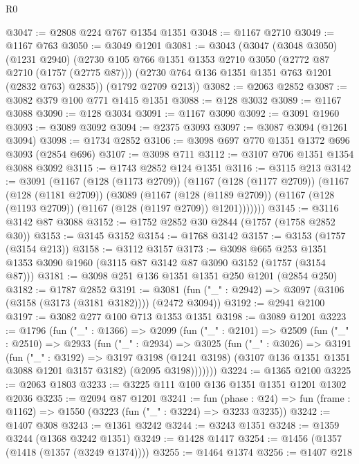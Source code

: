 \begin{lexlean}{R0}
\begin{coremodule}
@3047 := @2808 @224 @767 @1354 @1351
@3048 := @1167 @2710
@3049 := @1167 @763
@3050 := @3049 @1201
@3081 := @3043
    (@3047
      (@3048 @3050)
      (@1231 @2940)
      (@2730
        @105
        @766
        @1351
        @1353
        @2710
        @3050
        (@2772 @87 @2710 (@1757 (@2775 @87)))
        (@2730 @764 @136 @1351 @1351 @763 @1201 (@2832 @763) @2835))
      (@1792 @2709 @213))
@3082 := @2063 @2852
@3087 := @3082 @379 @100 @771 @1415 @1351
@3088 := @128 @3032
@3089 := @1167 @3088
@3090 := @128 @3034
@3091 := @1167 @3090
@3092 := @3091 @1960
@3093 := @3089 @3092
@3094 := @2375 @3093
@3097 := @3087 @3094 (@1261 @3094)
@3098 := @1734 @2852
@3106 := @3098 @697 @770 @1351 @1372 @696 @3093 (@2854 @696)
@3107 := @3098 @711
@3112 := @3107 @706 @1351 @1354 @3088 @3092
@3115 := @1743 @2852 @124 @1351
@3116 := @3115 @213
@3142 := @3091
    (@1167
      (@128 (@1173 @2709))
      (@1167
        (@128 (@1177 @2709))
        (@1167
          (@128 (@1181 @2709))
          (@3089
            (@1167
              (@128 (@1189 @2709))
              (@1167 (@128 (@1193 @2709)) (@1167 (@128 (@1197 @2709)) @1201)))))))
@3145 := @3116 @3142 @87 @3088
@3152 := @1752 @2852 @30 @2844 (@1757 (@1758 @2852 @30))
@3153 := @3145 @3152
@3154 := @1768 @3142
@3157 := @3153 (@1757 (@3154 @213))
@3158 := @3112 @3157
@3173 := @3098
    @665
    @253
    @1351
    @1353
    @3090
    @1960
    (@3115 @87 @3142 @87 @3090 @3152 (@1757 (@3154 @87)))
@3181 := @3098 @251 @136 @1351 @1351 @250 @1201 (@2854 @250)
@3182 := @1787 @2852
@3191 := @3081 (fun ("_" : @2942) => @3097 (@3106 (@3158 (@3173 (@3181 @3182)))) (@2472 @3094))
@3192 := @2941 @2100
@3197 := @3082 @277 @100 @713 @1353 @1351
@3198 := @3089 @1201
@3223 := @1796
    (fun ("_" : @1366) =>
    @2099
      (fun ("_" : @2101) =>
      @2509
        (fun ("_" : @2510) =>
        @2933
          (fun ("_" : @2934) =>
          @3025
            (fun ("_" : @3026) =>
            @3191
              (fun ("_" : @3192) =>
              @3197
                @3198
                (@1241 @3198)
                (@3107 @136 @1351 @1351 @3088 @1201 @3157 @3182)
                (@2095 @3198)))))))
@3224 := @1365 @2100
@3225 := @2063 @1803
@3233 := @3225 @111 @100 @136 @1351 @1351 @1201 @1302 @2036
@3235 := @2094 @87 @1201
@3241 := fun (phase : @24) =>
  fun (frame : @1162) => @1550 (@3223 (fun ("_" : @3224) => @3233 @3235))
@3242 := @1407 @308
@3243 := @1361 @3242
@3244 := @3243 @1351
@3248 := @1359 @3244 (@1368 @3242 @1351)
@3249 := @1428 @1417
@3254 := @1456 (@1357 (@1418 (@1357 (@3249 @1374))))
@3255 := @1464 @1374
@3256 := @1407 @218

\end{coremodule}
\end{lexlean}
